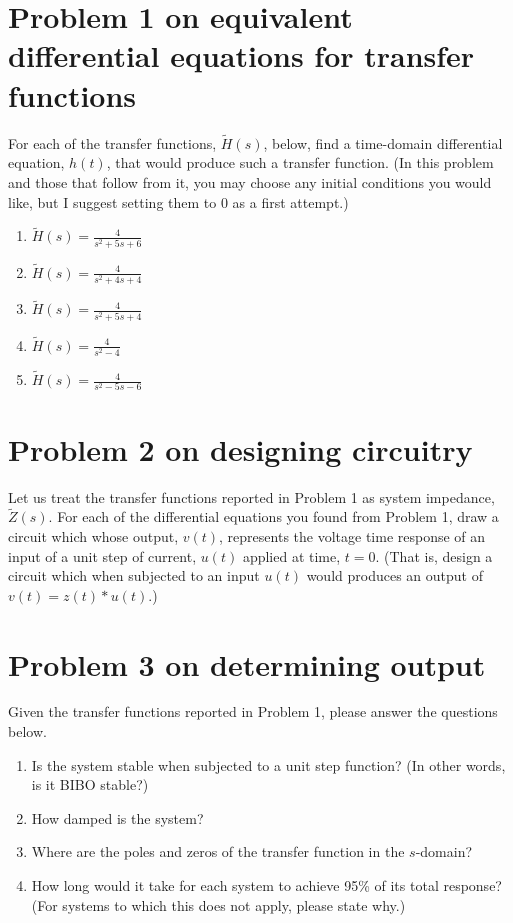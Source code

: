 \documentclass[11pt]{book}
\begin{document}
\section{Problem 1 on equivalent differential equations for transfer functions}
For each of the transfer functions, $\tilde{H}(s)$, below, find a time-domain differential equation, $h(t)$, that would produce such a transfer function. (In this problem and those that follow from it, you may choose any initial conditions you would like, but I suggest setting them to 0 as a first attempt.)
\begin{enumerate}
	\item $\tilde{H}(s) = \frac{4}{s^2+5s+6}$
	\item $\tilde{H}(s) = \frac{4}{s^2+4s+4}$
	\item $\tilde{H}(s) = \frac{4}{s^2+5s+4}$
	\item $\tilde{H}(s) = \frac{4}{s^2-4}$
	\item $\tilde{H}(s) = \frac{4}{s^2-5s-6}$
\end{enumerate}

\newpage
\section{Problem 2 on designing circuitry}
Let us treat the transfer functions reported in Problem 1 as system impedance, $\tilde{Z}(s)$.
For each of the differential equations you found from Problem 1, draw a circuit which whose output, $v(t)$, represents the voltage time response of an input of a unit step of current, $u(t)$ applied at time, $t = 0$. (That is, design a circuit which when subjected to an input $u(t)$ would produces an output of $v(t) = z(t)*u(t)$.)

\section{Problem 3 on determining output}
Given the transfer functions reported in Problem 1, please answer the questions below.
\begin{enumerate}
	\item Is the system stable when subjected to a unit step function? (In other words, is it BIBO stable?)
	\item How damped is the system?
	\item Where are the poles and zeros of the transfer function in the $s$-domain?
	\item How long would it take for each system to achieve 95\% of its total response? (For systems to which this does not apply, please state why.)
\end{enumerate}
\end{document}
